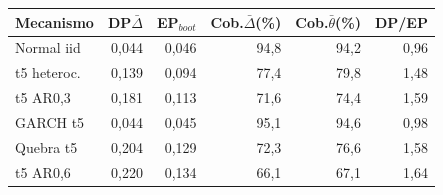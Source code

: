 \begin{tabular}{lrrrrr}
\toprule
Mecanismo & DP$\bar\Delta$ & EP$_{boot}$ & Cob.$\bar\Delta$(\%) & Cob.$\bar\theta$(\%) & DP/EP\\
\midrule
Normal iid & 0,044 & 0,046 & 94,8 & 94,2 & 0,96\\
t5 heteroc. & 0,139 & 0,094 & 77,4 & 79,8 & 1,48\\
t5 AR0,3 & 0,181 & 0,113 & 71,6 & 74,4 & 1,59\\
GARCH t5 & 0,044 & 0,045 & 95,1 & 94,6 & 0,98\\
Quebra t5 & 0,204 & 0,129 & 72,3 & 76,6 & 1,58\\
t5 AR0,6 & 0,220 & 0,134 & 66,1 & 67,1 & 1,64\\
\bottomrule
\end{tabular}
